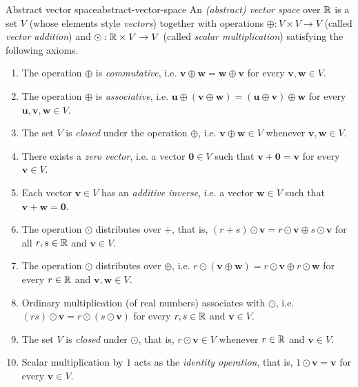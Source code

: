 \begin{definition}{Abstract vector space}{abstract-vector-space}
 An \emph{(abstract) vector space} over $\mathbb{R}$ is a set $V$ (whose elements style
 \emph{vectors}) together with operations $ \oplus :V \times V \to V$ (called
 \emph{vector addition}) and $\odot: \mathbb{R} \times V \to V$ (called \emph{scalar
 multiplication}) satisfying the following axioms.
 \begin{enumerate}
  \item The operation $ \oplus $ is \emph{commutative}, i.e. $\mathbf{v} \oplus
   \mathbf{w} = \mathbf{w} \oplus \mathbf{v}$ for every
   $\mathbf{v},\mathbf{w} \in V$.
  \item The operation $ \oplus $ is \emph{associative}, i.e. $\mathbf{u} \oplus
   (\mathbf{v} \oplus \mathbf{w}) = (\mathbf{u} \oplus \mathbf{v}) \oplus
   \mathbf{w}$ for every $\mathbf{u},\mathbf{v},\mathbf{w} \in V$.
  \item The set $V$ is \emph{closed} under the operation $ \oplus $, i.e.
   $\mathbf{v} \oplus \mathbf{w} \in V$ whenever $\mathbf{v},\mathbf{w} \in V$.
  \item There exists a \emph{zero vector}, i.e. a vector $\mathbf{0} \in V$ such
   that $\mathbf{v} + \mathbf{0} = \mathbf{v}$ for every $\mathbf{v} \in V$.
  \item Each vector $\mathbf{v} \in V$ has an \emph{additive inverse}, i.e. a
   vector $\mathbf{w} \in V$ such that $\mathbf{v} + \mathbf{w} = \mathbf{0}$.
  \item The operation $\odot$ distributes over $+$, that is, $(r + s) \odot
   \mathbf{v} = r \odot \mathbf{v} \oplus s \odot \mathbf{v}$ for all $r,s \in
   \mathbb{R}$ and $\mathbf{v} \in V$.
  \item The operation $\odot$ distributes over $ \oplus $, i.e. $r \odot
   (\mathbf{v} \oplus \mathbf{w}) = r \odot \mathbf{v} \oplus r \odot
   \mathbf{w}$ for every $r \in \mathbb{R}$ and $\mathbf{v},\mathbf{w} \in V$.
  \item Ordinary multiplication (of real numbers) associates with $\odot$, i.e.
   $(rs) \odot \mathbf{v} = r \odot (s \odot \mathbf{v})$ for every $r,s \in \mathbb{R}$
   and $\mathbf{v} \in V$.
  \item The set $V$ is \emph{closed} under $\odot$, that is, $r \odot
   \mathbf{v} \in V$ whenever $r \in \mathbb{R}$ and $\mathbf{v} \in V$.
  \item Scalar multiplication by $1$ acts as the \emph{identity operation}, that
   is, $1\odot \mathbf{v} = \mathbf{v}$ for every $\mathbf{v} \in V$.
 \end{enumerate}
\end{definition}


